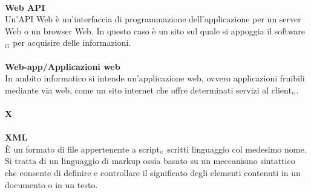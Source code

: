 \\
\textbf{Web API}\\
Un'API Web è un'interfaccia di programmazione dell'applicazione per un server Web o un browser Web.
In questo caso è un sito sul quale si appoggia il software$_G$ per acquisire delle informazioni.\\
\\
\textbf{Web-app/Applicazioni web}\\
In ambito informatico si intende un'applicazione web, ovvero applicazioni fruibili mediante via web, come un sito internet che offre determinati servizi al client$_{\scaleto{G}{3pt}}$.\\
\\
\textbf{X}\\
\\
\textbf{XML}\\
È un formato di file appertenente a script$_{\scaleto{G}{3pt}}$ scritti linguaggio col medesimo nome.
Si tratta di un linguaggio di markup ossia basato su un meccanismo sintattico che consente di definire e controllare il significato degli elementi contenuti in un documento o in un testo.\\
\\
